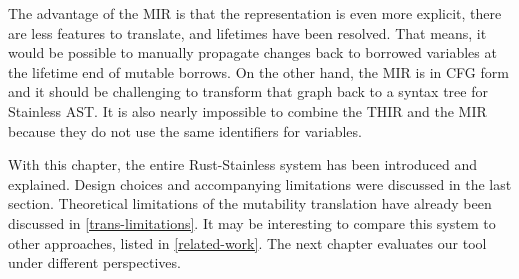 The advantage of the MIR is that the representation is even more explicit, there
are less features to translate, and lifetimes have been resolved. That means, it
would be possible to manually propagate changes back to borrowed variables at
the lifetime end of mutable borrows. On the other hand, the MIR is in CFG form
and it should be challenging to transform that graph back to a syntax tree for
Stainless AST. It is also nearly impossible to combine the THIR and the MIR
because they do not use the same identifiers for variables.

\hfill \break \noindent With this chapter, the entire Rust-Stainless system has
been introduced and explained. Design choices and accompanying limitations were
discussed in the last section. Theoretical limitations of the mutability
translation have already been discussed in \autoref{trans-limitations}. It may
be interesting to compare this system to other approaches, listed in
\autoref{related-work}. The next chapter evaluates our tool under different
perspectives.
